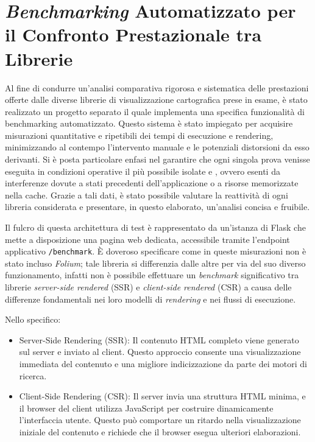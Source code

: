 \section{\textit{Benchmarking} Automatizzato per il Confronto Prestazionale tra Librerie}

Al fine di condurre un'analisi comparativa rigorosa e sistematica delle prestazioni
offerte dalle diverse librerie di visualizzazione cartografica prese in esame, è
stato realizzato un progetto separato il quale implementa una specifica
funzionalità di benchmarking automatizzato. Questo sistema è stato impiegato per
acquisire misurazioni quantitative e ripetibili dei tempi di esecuzione e rendering,
minimizzando al contempo l'intervento manuale e le potenziali distorsioni da
esso derivanti. Si è posta particolare enfasi nel garantire che ogni singola prova
venisse eseguita in condizioni operative il più possibile isolate e ,
ovvero esenti da interferenze dovute a stati precedenti dell'applicazione o a risorse
memorizzate nella cache. Grazie a tali dati, è stato possibile valutare la reattività
di ogni libreria considerata e presentare, in questo elaborato, un'analisi concisa
e fruibile.

Il fulcro di questa architettura di test è rappresentato da un'istanza di Flask che
mette a disposizione una pagina web dedicata, accessibile tramite l'endpoint
applicativo \texttt{/benchmark}. È doveroso specificare come in queste
misurazioni non è stato incluso \textit{Folium}; tale libreria si differenzia
dalle altre per via del suo diverso funzionamento, infatti non è possibile effettuare
un \textit{benchmark} significativo tra librerie \textit{server-side rendered} (SSR)
e \textit{client-side rendered} (CSR) a causa delle differenze fondamentali nei
loro modelli di \textit{rendering} e nei flussi di esecuzione.

Nello specifico:
\begin{itemize}
  \item Server-Side Rendering (SSR): Il contenuto HTML completo viene generato
    sul server e inviato al client. Questo approccio consente una visualizzazione
    immediata del contenuto e una migliore indicizzazione da parte dei motori di
    ricerca. \cite{peerdh-ssr-csr-comparison}

  \item Client-Side Rendering (CSR): Il server invia una struttura HTML minima, e
    il browser del client utilizza JavaScript per costruire dinamicamente l'interfaccia
    utente. Questo può comportare un ritardo nella visualizzazione iniziale del
    contenuto e richiede che il browser esegua ulteriori elaborazioni. \cite{devto-csr-vs-ssr}
\end{itemize}

